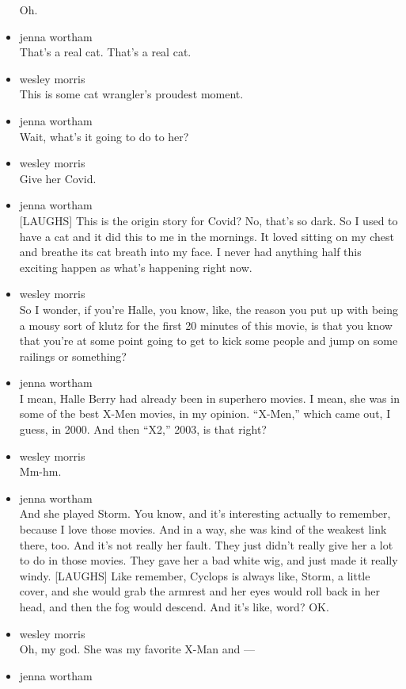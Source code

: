 \begin{itemize}
  Oh.
\item
  jenna wortham\\
  That's a real cat. That's a real cat.
\item
  wesley morris\\
  This is some cat wrangler's proudest moment.
\item
  jenna wortham\\
  Wait, what's it going to do to her?
\item
  wesley morris\\
  Give her Covid.
\item
  jenna wortham\\
  {[}LAUGHS{]} This is the origin story for Covid? No, that's so dark.
  So I used to have a cat and it did this to me in the mornings. It
  loved sitting on my chest and breathe its cat breath into my face. I
  never had anything half this exciting happen as what's happening right
  now.
\item
  wesley morris\\
  So I wonder, if you're Halle, you know, like, the reason you put up
  with being a mousy sort of klutz for the first 20 minutes of this
  movie, is that you know that you're at some point going to get to kick
  some people and jump on some railings or something?
\item
  jenna wortham\\
  I mean, Halle Berry had already been in superhero movies. I mean, she
  was in some of the best X-Men movies, in my opinion. ``X-Men,'' which
  came out, I guess, in 2000. And then ``X2,'' 2003, is that right?
\item
  wesley morris\\
  Mm-hm.
\item
  jenna wortham\\
  And she played Storm. You know, and it's interesting actually to
  remember, because I love those movies. And in a way, she was kind of
  the weakest link there, too. And it's not really her fault. They just
  didn't really give her a lot to do in those movies. They gave her a
  bad white wig, and just made it really windy. {[}LAUGHS{]} Like
  remember, Cyclops is always like, Storm, a little cover, and she would
  grab the armrest and her eyes would roll back in her head, and then
  the fog would descend. And it's like, word? OK.
\item
  wesley morris\\
  Oh, my god. She was my favorite X-Man and ---
\item
  jenna wortham\\

\end{itemize}
